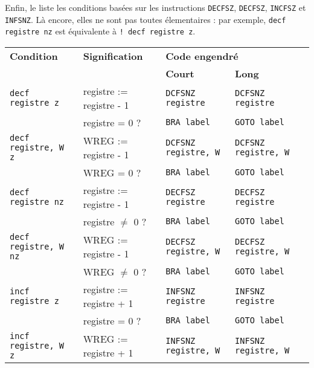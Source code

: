 Enfin, le  liste les conditions basées sur les instructions \texttt{DECFSZ}, \texttt{DECFSZ}, \texttt{INCFSZ} et \texttt{INFSNZ}. Là encore, elles ne sont pas toutes élementaires : par exemple, \texttt{decf registre nz} est équivalente à \texttt{! decf registre z}. 

\begin{table}[!ht]
  \centering
  \small
  \begin{tabular}{lllll}
    \textbf{Condition} & \textbf{Signification} & \multicolumn{2}{l}{\bf Code engendré}\\
                       &                        & \textbf{Court} & \textbf{Long}\\
    \hline
                           \texttt{decf registre z}   & registre := registre - 1    &\texttt{DCFSNZ registre}  & \texttt{DCFSNZ registre}\\
                                                      & registre = 0 ?              &\texttt{BRA label}        & \texttt{GOTO label}\\
    \rowcolor{\fondTableau}\texttt{decf registre, W z}& WREG := registre - 1 &\texttt{DCFSNZ registre, W}  & \texttt{DCFSNZ registre, W}\\
    \rowcolor{\fondTableau}                           & WREG = 0 ?           &\texttt{BRA label}           & \texttt{GOTO label}\\
                           \texttt{decf registre nz}  & registre := registre - 1    &\texttt{DECFSZ registre}  & \texttt{DECFSZ registre}\\
                                                      & registre $\ne$ 0 ?              &\texttt{BRA label}        & \texttt{GOTO label}\\
    \rowcolor{\fondTableau}\texttt{decf registre, W nz}& WREG := registre - 1 &\texttt{DECFSZ registre, W}  & \texttt{DECFSZ registre, W}\\
    \rowcolor{\fondTableau}                           & WREG $\ne$ 0 ?           &\texttt{BRA label}           & \texttt{GOTO label}\\
                           \texttt{incf registre z}   & registre := registre + 1    &\texttt{INFSNZ registre}  & \texttt{INFSNZ registre}\\
                                                      & registre = 0 ?              &\texttt{BRA label}        & \texttt{GOTO label}\\
    \rowcolor{\fondTableau}\texttt{incf registre, W z}& WREG := registre + 1 &\texttt{INFSNZ registre, W}  & \texttt{INFSNZ registre, W}\\

\end{tabular}
\end{table}
